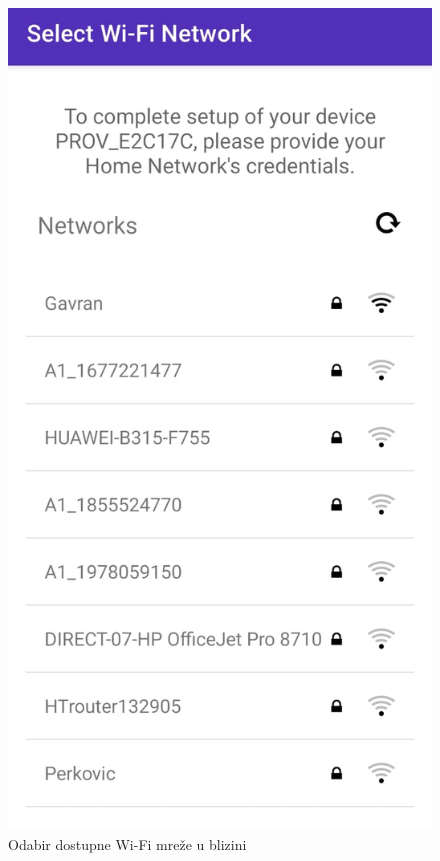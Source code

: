 \begin{figure}[ht]
	\hspace*{\fill}
	\begin{minipage}[t]{0.3\textwidth}
		\includegraphics[width=\linewidth]{imgs/esp_softap_app2}
		\caption{Odabir dostupne Wi-Fi mreže u blizini}
		\label{fig:esp_softap_app2}
	\end{minipage}
\end{figure}

